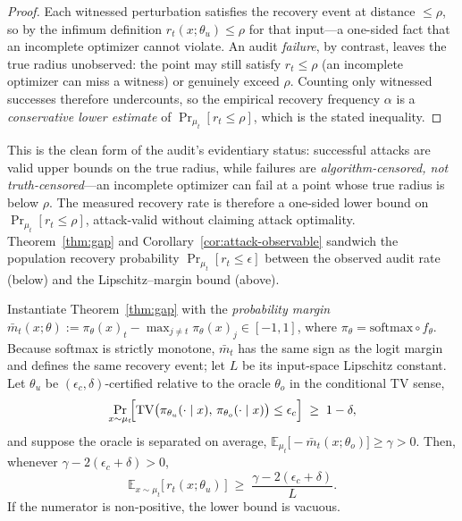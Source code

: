 \begin{proof}
Each witnessed perturbation satisfies the recovery event at distance
$\leq \rho$, so by the infimum definition $r_t(x;\theta_u) \leq \rho$ for that
input---a one-sided fact that an incomplete optimizer cannot violate. An audit
\emph{failure}, by contrast, leaves the true radius unobserved: the point may
still satisfy $r_t \leq \rho$ (an incomplete optimizer can miss a witness) or
genuinely exceed $\rho$. Counting only witnessed successes therefore undercounts,
so the empirical recovery frequency $\alpha$ is a \emph{conservative lower
estimate} of $\Pr_{\mu_t}[r_t \leq \rho]$, which is the stated inequality.
\end{proof}

\noindent This is the clean form of the audit's evidentiary status: successful
attacks are valid upper bounds on the true radius, while failures are
\emph{algorithm-censored, not truth-censored}---an incomplete optimizer can fail
at a point whose true radius is below $\rho$. The measured recovery rate is
therefore a one-sided lower bound on $\Pr_{\mu_t}[r_t \leq \rho]$, attack-valid
without claiming attack optimality. Theorem~\ref{thm:gap} and
Corollary~\ref{cor:attack-observable} sandwich the population recovery
probability $\Pr_{\mu_t}[r_t \leq \epsilon]$ between the observed audit rate
(below) and the Lipschitz--margin bound (above).

\begin{corollary}
\label{cor:cert}
Instantiate Theorem~\ref{thm:gap} with the \emph{probability margin}
$\bar m_t(x;\theta) := \pi_\theta(x)_t - \max_{j \neq t}\pi_\theta(x)_j \in [-1,1]$,
where $\pi_\theta = \mathrm{softmax}\circ f_\theta$. Because softmax is strictly
monotone, $\bar m_t$ has the same sign as the logit margin and defines the same
recovery event; let $L$ be its input-space Lipschitz constant. Let $\theta_u$
be $(\epsilon_c,\delta)$-certified relative to the oracle $\theta_o$ in the
conditional TV sense,
\[
\Pr_{x \sim \mu_t}\!\Bigl[
\mathrm{TV}\bigl(\pi_{\theta_u}(\cdot \mid x),\, \pi_{\theta_o}(\cdot \mid x)\bigr)
\leq \epsilon_c\Bigr] \;\geq\; 1 - \delta,
\]
and suppose the oracle is separated on average,
$\mathbb{E}_{\mu_t}\!\bigl[-\bar m_t(x;\theta_o)\bigr] \geq \gamma > 0$. Then,
whenever $\gamma - 2(\epsilon_c+\delta)>0$,
\begin{equation}
  \mathbb{E}_{x \sim \mu_t}\!\bigl[\,r_t(x;\theta_u)\,\bigr]
  \;\geq\; \frac{\gamma - 2(\epsilon_c + \delta)}{L}.
\end{equation}
If the numerator is non-positive, the lower bound is vacuous.
\end{corollary}

